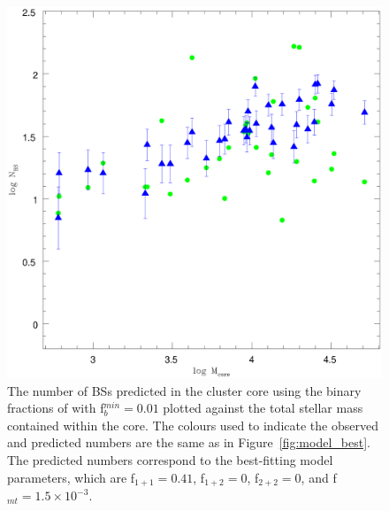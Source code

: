\begin{figure} [!h]
  \begin{center}
 \includegraphics[scale=0.5]{Chapter-5/fig2.eps}
\caption[The predicted number of BSs plotted versus the total stellar
mass in the core for the best-fitting model parameters found using the
binary fractions of \citet{sollima07} with f$_b^{min} = 0.01$]{The
  number of BSs predicted in the cluster core using the binary
  fractions of \citet{sollima07} with f$_b^{min} = 0.01$ plotted
  against the total stellar mass contained within the core.  The
  colours used to indicate the observed and predicted numbers are the
  same as in Figure~\ref{fig:model_best}.  The predicted numbers correspond to
  the best-fitting model parameters, which are f$_{1+1} = 0.41$,
  f$_{1+2} = 0$, f$_{2+2} = 0$, and f$_{mt} = 1.5 \times 10^{-3}$.
\label{fig:model_rmax_sollima_best}}
\end{center}
\end{figure}

